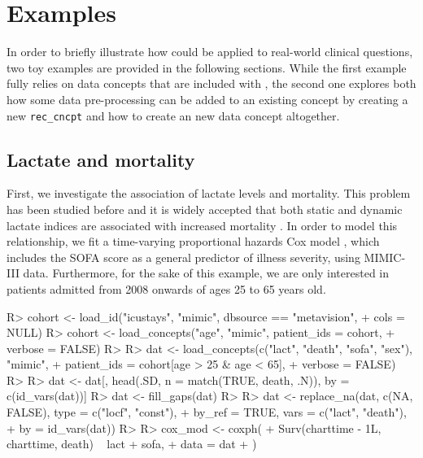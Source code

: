 \documentclass[
]{jss}
\begin{document}
\hypertarget{examples}{%
\section{Examples}\label{examples}}

In order to briefly illustrate how  could be applied to
real-world clinical questions, two toy examples are provided in the
following sections. While the first example fully relies on data
concepts that are included with , the second one explores both
how some data pre-processing can be added to an existing concept by
creating a new \texttt{rec\_cncpt} and how to create an new data concept
altogether.

\hypertarget{lactate-and-mortality}{%
\subsection{Lactate and mortality}\label{lactate-and-mortality}}

First, we investigate the association of lactate levels and mortality.
This problem has been studied before and it is widely accepted that both
static and dynamic lactate indices are associated with increased
mortality \citep{haas2016, nichol2011, van2013}. In order to model this
relationship, we fit a time-varying proportional hazards Cox model
\citep{therneau2000, therneau2015}, which includes the SOFA score as a
general predictor of illness severity, using MIMIC-III data.
Furthermore, for the sake of this example, we are only interested in
patients admitted from 2008 onwards of ages 25 to 65 years old.

\begin{CodeChunk}
\begin{CodeInput}
R> cohort <- load_id("icustays", "mimic", dbsource == "metavision",
+                   cols = NULL)
R> cohort <- load_concepts("age", "mimic", patient_ids = cohort,
+                         verbose = FALSE)
R> 
R> dat <- load_concepts(c("lact", "death", "sofa", "sex"), "mimic",
+                      patient_ids = cohort[age > 25 & age < 65],
+                      verbose = FALSE)
R> 
R> dat <- dat[, head(.SD, n = match(TRUE, death, .N)), by = c(id_vars(dat))]
R> dat <- fill_gaps(dat)
R> 
R> dat <- replace_na(dat, c(NA, FALSE), type = c("locf", "const"),
+                   by_ref = TRUE, vars = c("lact", "death"),
+                   by = id_vars(dat))
R> 
R> cox_mod <- coxph(
+   Surv(charttime - 1L, charttime, death) ~ lact + sofa,
+   data = dat
+ )
\end{CodeInput}
\end{CodeChunk}
\end{document}
